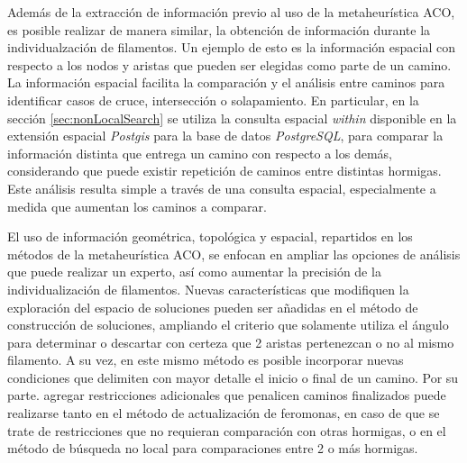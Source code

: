 Adem\'as de la extracci\'on de informaci\'on previo al uso de la metaheur\'istica ACO, es posible realizar de manera similar, la obtenci\'on de informaci\'on durante la individualzaci\'on de filamentos. Un ejemplo de esto es la informaci\'on espacial con respecto a los nodos y aristas que pueden ser elegidas como parte de un camino. La informaci\'on espacial facilita la comparaci\'on y el an\'alisis entre caminos para identificar casos de cruce, intersecci\'on o solapamiento. En particular, en la secci\'on \ref{sec:nonLocalSearch} se utiliza la consulta espacial {\it within} disponible en la extensi\'on espacial {\it Postgis} para la base de datos {\it PostgreSQL}, para comparar la informaci\'on distinta que entrega un camino con respecto a los dem\'as, considerando que puede existir repetici\'on de caminos entre distintas hormigas. Este an\'alisis resulta simple a trav\'es de una consulta espacial, especialmente a medida que aumentan los caminos a comparar.

El uso de informaci\'on geom\'etrica, topol\'ogica y espacial, repartidos en los m\'etodos de la metaheur\'istica ACO, se enfocan en ampliar las opciones de an\'alisis que puede realizar un experto, as\'i como aumentar la precisi\'on de la individualizaci\'on de filamentos. Nuevas caracter\'isticas que modifiquen la exploraci\'on del espacio de soluciones pueden ser a\~nadidas en el m\'etodo de construcci\'on de soluciones, ampliando el criterio que solamente utiliza el \'angulo para determinar o descartar con certeza que 2 aristas pertenezcan o no al mismo filamento. A su vez, en este mismo m\'etodo es posible incorporar nuevas condiciones que delimiten con mayor detalle el inicio o final de un camino.
Por su parte. agregar restricciones adicionales que penalicen caminos finalizados puede realizarse tanto en el m\'etodo de actualizaci\'on de feromonas, en caso de que se trate de restricciones que no requieran comparaci\'on con otras hormigas, o en el m\'etodo de b\'usqueda no local para comparaciones entre 2 o m\'as hormigas.

